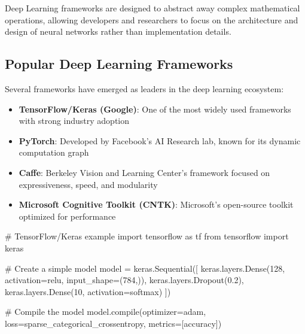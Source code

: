 \documentclass[
  letterpaper,
  DIV=11,
  numbers=noendperiod]{scrreprt}
\newenvironment{Shaded}{\begin{snugshade}}{\end{snugshade}}
\newcommand{\BuiltInTok}[1]{\textcolor[rgb]{0.00,0.23,0.31}{#1}}
\newcommand{\CommentTok}[1]{\textcolor[rgb]{0.37,0.37,0.37}{#1}}
\newcommand{\DecValTok}[1]{\textcolor[rgb]{0.68,0.00,0.00}{#1}}
\newcommand{\FloatTok}[1]{\textcolor[rgb]{0.68,0.00,0.00}{#1}}
\newcommand{\ImportTok}[1]{\textcolor[rgb]{0.00,0.46,0.62}{#1}}
\newcommand{\NormalTok}[1]{\textcolor[rgb]{0.00,0.23,0.31}{#1}}
\newcommand{\OperatorTok}[1]{\textcolor[rgb]{0.37,0.37,0.37}{#1}}
\newcommand{\StringTok}[1]{\textcolor[rgb]{0.13,0.47,0.30}{#1}}
\providecommand{\tightlist}{%
  \setlength{\itemsep}{0pt}\setlength{\parskip}{0pt}}\usepackage{longtable,booktabs,array}
\begin{document}
Deep Learning frameworks are designed to abstract away complex
mathematical operations, allowing developers and researchers to focus on
the architecture and design of neural networks rather than
implementation details.

\subsection{Popular Deep Learning
Frameworks}\label{popular-deep-learning-frameworks}

Several frameworks have emerged as leaders in the deep learning
ecosystem:

\begin{itemize}
\tightlist
\item
  \textbf{TensorFlow/Keras (Google)}: One of the most widely used
  frameworks with strong industry adoption
\item
  \textbf{PyTorch}: Developed by Facebook's AI Research lab, known for
  its dynamic computation graph
\item
  \textbf{Caffe}: Berkeley Vision and Learning Center's framework
  focused on expressiveness, speed, and modularity
\item
  \textbf{Microsoft Cognitive Toolkit (CNTK)}: Microsoft's open-source
  toolkit optimized for performance
\end{itemize}

\begin{Shaded}
\begin{Highlighting}[]
\CommentTok{\# TensorFlow/Keras example}
\ImportTok{import}\NormalTok{ tensorflow }\ImportTok{as}\NormalTok{ tf}
\ImportTok{from}\NormalTok{ tensorflow }\ImportTok{import}\NormalTok{ keras}

\CommentTok{\# Create a simple model}
\NormalTok{model }\OperatorTok{=}\NormalTok{ keras.Sequential([}
\NormalTok{    keras.layers.Dense(}\DecValTok{128}\NormalTok{, activation}\OperatorTok{=}\StringTok{\textquotesingle{}relu\textquotesingle{}}\NormalTok{, input\_shape}\OperatorTok{=}\NormalTok{(}\DecValTok{784}\NormalTok{,)),}
\NormalTok{    keras.layers.Dropout(}\FloatTok{0.2}\NormalTok{),}
\NormalTok{    keras.layers.Dense(}\DecValTok{10}\NormalTok{, activation}\OperatorTok{=}\StringTok{\textquotesingle{}softmax\textquotesingle{}}\NormalTok{)}
\NormalTok{])}

\CommentTok{\# Compile the model}
\NormalTok{model.}\BuiltInTok{compile}\NormalTok{(optimizer}\OperatorTok{=}\StringTok{\textquotesingle{}adam\textquotesingle{}}\NormalTok{,}
\NormalTok{              loss}\OperatorTok{=}\StringTok{\textquotesingle{}sparse\_categorical\_crossentropy\textquotesingle{}}\NormalTok{,}
\NormalTok{              metrics}\OperatorTok{=}\NormalTok{[}\StringTok{\textquotesingle{}accuracy\textquotesingle{}}\NormalTok{])}
\end{Highlighting}
\end{Shaded}
\end{document}

